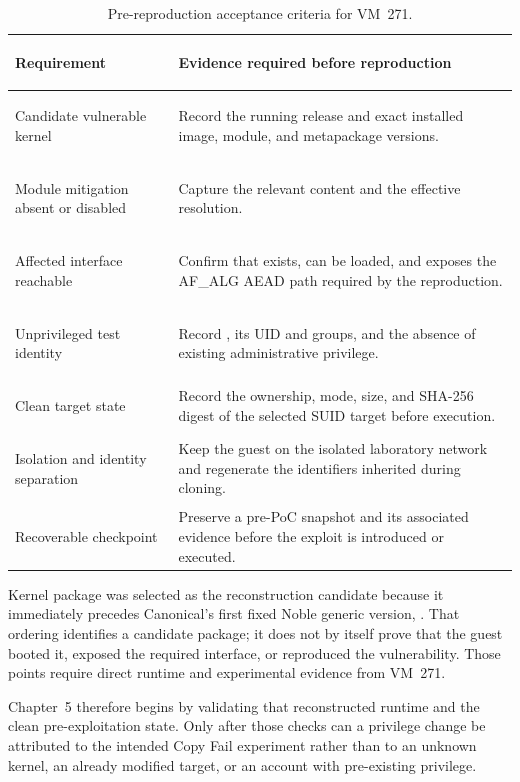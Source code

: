 \begin{table}[H]
    \centering
    \caption{Pre-reproduction acceptance criteria for VM~271.}
    \label{tab:vulnerable-clone-requirements}
    \small
    \begin{tabularx}{\textwidth}{@{}>{\bfseries\raggedright\arraybackslash}p{}Y@{}}
        \toprule
        Requirement & Evidence required before reproduction \\
        \midrule
        Candidate vulnerable kernel &
        Record the running release and exact installed image, module, and
        metapackage versions. \\

        Module mitigation absent or disabled &
        Capture the relevant  content and the effective
         resolution. \\

        Affected interface reachable &
        Confirm that  exists, can be loaded, and exposes the
        AF\_ALG AEAD path required by the reproduction. \\

        Unprivileged test identity &
        Record , its UID and groups, and the absence of existing
        administrative privilege. \\

        Clean target state &
        Record the ownership, mode, size, and SHA-256 digest of the selected
        SUID target before execution. \\

        Isolation and identity separation &
        Keep the guest on the isolated laboratory network and regenerate the
        identifiers inherited during cloning. \\

        Recoverable checkpoint &
        Preserve a pre-PoC snapshot and its associated evidence before the
        exploit is introduced or executed. \\
        \bottomrule
    \end{tabularx}
\end{table}

Kernel package  was selected as the reconstruction
candidate because it immediately precedes Canonical's first fixed Noble generic
version, . That ordering identifies a candidate package;
it does not by itself prove that the guest booted it, exposed the required
interface, or reproduced the vulnerability. Those points require direct runtime
and experimental evidence from VM~271.

Chapter~5 therefore begins by validating that reconstructed runtime and the
clean pre-exploitation state. Only after those checks can a privilege change be
attributed to the intended Copy Fail experiment rather than to an unknown
kernel, an already modified target, or an account with pre-existing privilege.